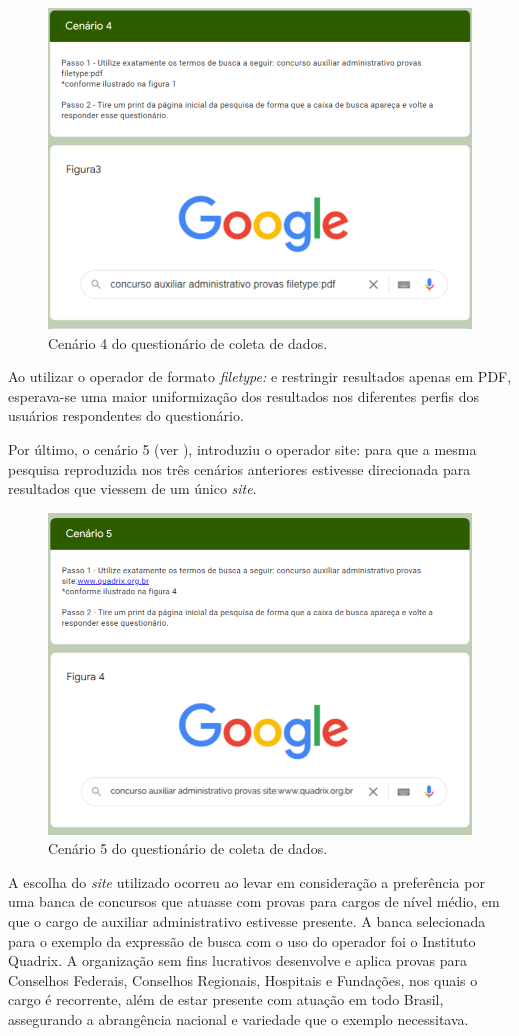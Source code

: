 \documentclass[portuguese]{textolivre}
\begin{document}
\begin{figure}[h!]
    \centering
    \includegraphics[width=0.7\linewidth]{fig-007.png}
    \caption{Cenário 4 do questionário de coleta de dados.}
    \label{fig7}
\end{figure}

Ao utilizar o operador de formato \textit{filetype:} e restringir resultados apenas em PDF, esperava-se uma maior uniformização dos resultados nos diferentes perfis dos usuários respondentes do questionário.

Por último, o cenário 5 (ver ), introduziu o operador site: para que a mesma pesquisa reproduzida nos três cenários anteriores estivesse direcionada para resultados que viessem de um único \textit{site}.

\begin{figure}[h!]
    \centering
    \includegraphics[width=0.7\linewidth]{fig-008.png}
    \caption{Cenário 5 do questionário de coleta de dados.}
    \label{fig8}
\end{figure}

A escolha do \textit{site} utilizado ocorreu ao levar em consideração a preferência por uma banca de concursos que atuasse com provas para cargos de nível médio, em que o cargo de auxiliar administrativo estivesse presente. A banca selecionada para o exemplo da expressão de busca com o uso do operador foi o Instituto Quadrix. A organização sem fins lucrativos desenvolve e aplica provas para Conselhos Federais, Conselhos Regionais, Hospitais e Fundações, nos quais o cargo é recorrente, além de estar presente com atuação em todo Brasil, assegurando a abrangência nacional e variedade que o exemplo necessitava.
\end{document}
